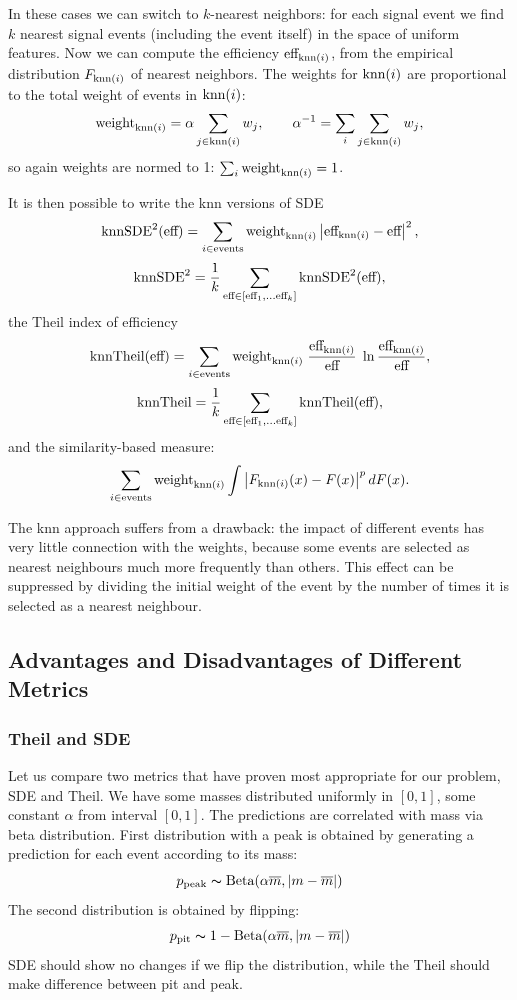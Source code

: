 In these cases we can switch to $k$-nearest neighbors: for each signal event we find $k$ nearest signal events (including the event itself)
in the space of uniform features. Now we can compute the efficiency $\text{eff}_{\text{knn}(i)}$, from the empirical distribution $F_{\text{knn}(i)}$ of nearest neighbors. 
The weights for $\text{knn}(i)$ are proportional to the total weight of events in $\text{knn}(i)$:
\[
	\text{weight}_{\text{knn}(i)} = \alpha \sum_{j \in \text{knn}(i)} w_j, \qquad \alpha^{-1} = \sum_i \sum_{j \in \text{knn}(i)} w_j,
\]
so again weights are normed to 1: $\sum_{i} \text{weight}_{\text{knn}(i)} = 1$. 

It is then possible to write the knn versions of SDE
\[
	\text{knnSDE}^2(\text{eff})
		= \sum_{i \in \text{events}} \text{weight}_{\text{knn}(i)} \left\vert\text{eff}_{\text{knn}(i)} - \text{eff}\right\vert^2,
\]
\[
	\text{knnSDE}^2 = \frac{1}{k} \sum_{\text{eff} \in [\text{eff}_1, \dots \text{eff}_k]} \text{knnSDE}^2(\text{eff}),
\]
the Theil index of efficiency
\[
	\text{knnTheil}(\text{eff}) = \sum_{i \in \text{events}} \text{weight}_{\text{knn}(i)} \; \frac{\text{eff}_{\text{knn}(i)}}{\text{eff}} \; \ln{\frac{\text{eff}_{\text{knn}(i)}}{\text{eff}}},
\]
\[
	\text{knnTheil} = \frac{1}{k} \sum_{\text{eff} \in [\text{eff}_1, \dots \text{eff}_k]} \text{knnTheil}(\text{eff}),
\]
and the similarity-based measure:
\[
	 \sum_{i \in \text{events}} \text{weight}_{\text{knn}(i)} \int \left\vert F_{\text{knn}(i)}(x) - F(x)\right\vert^p dF(x).
\]


The knn approach suffers from a drawback: the impact of different events has very little connection with the weights,
because some events are selected as nearest neighbours much more frequently than others.
This effect can be suppressed by dividing the initial weight of the event by the number of times it is selected 
as a nearest neighbour. 

\subsection*{Advantages and Disadvantages of Different Metrics}
\subsubsection*{Theil and SDE}
Let us compare two metrics that have proven most appropriate for our problem, SDE and Theil. We have some masses distributed uniformly in $[0,1]$, some constant $\alpha$ from interval $[0,1]$. 
The predictions are correlated with mass via beta distribution.
First distribution with a peak is obtained by generating a prediction for each event according to its mass:
\[
	p_{\rm peak} \thicksim \text{Beta}(\alpha \overline{m}, \left\vert m - \overline{m}\right\vert)
\]
The second distribution is obtained by flipping:
\[
	p_{\rm pit} \thicksim 1 - \text{Beta}(\alpha \overline{m}, \left\vert m - \overline{m}\right\vert)
\]
SDE should show no changes if we flip the distribution, while the Theil should make difference between pit and peak. 

